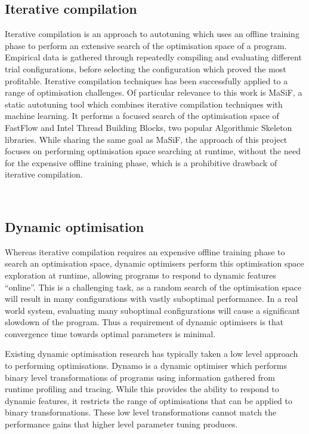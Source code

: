 \subsection{Iterative compilation}
Iterative compilation is an approach to autotuning which uses an
offline training phase to perform an extensive search of the
optimisation space of a program.  Empirical data is gathered through
repeatedly compiling and evaluating different trial configurations,
before selecting the configuration which proved the most
profitable. Iterative compilation techniques has been successfully
applied to a range of optimisation challenges. Of particular relevance
to this work is MaSiF, a static autotuning tool which combines
iterative compilation techniques with machine learning.  It performs a
focused search of the optimisation space of FastFlow and Intel Thread
Building Blocks, two popular Algorithmic Skeleton libraries. While
sharing the same goal as MaSiF, the approach of this project focuses
on performing optimisation space searching at runtime, without the
need for the expensive offline training phase, which is a prohibitive
drawback of iterative compilation.

~\cite{Fursin2010}

\subsection{Dynamic optimisation}
Whereas iterative compilation requires an expensive offline training
phase to search an optimisation space, dynamic optimisers perform this
optimisation space exploration at runtime, allowing programs to
respond to dynamic features ``online''. This is a challenging task, as
a random search of the optimisation space will result in many
configurations with vastly suboptimal performance. In a real world
system, evaluating many suboptimal configurations will cause a
significant slowdown of the program. Thus a requirement of dynamic
optimisers is that convergence time towards optimal parameters is
minimal.

Existing dynamic optimisation research has typically taken a low level
approach to performing optimisations. Dynamo is a dynamic optimiser
which performs binary level transformations of programs using
information gathered from runtime profiling and tracing. While this
provides the ability to respond to dynamic features, it restricts the
range of optimisations that can be applied to binary
transformations. These low level transformations cannot match the
performance gains that higher level parameter tuning produces.

